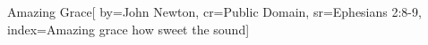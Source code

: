{Amazing Grace}[
    by={John Newton},
    cr={Public Domain},
    sr={Ephesians 2:8-9},
    index={Amazing grace how sweet the sound}]
